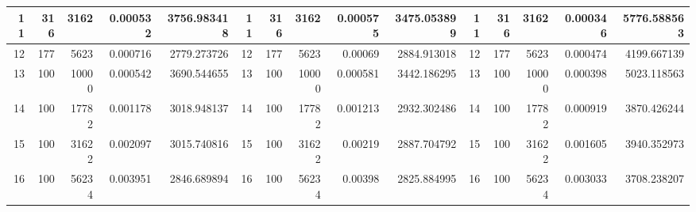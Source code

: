 \begin{table}[htbp]
\begin{tabular}{|r|r|r|r|r|r|r|r|r|r|r|r|r|r|r|}
		\midrule
		11                                & 316                             & 3162                            & 0.000532                           & 3756.983418                          & 11                               & 316                             & 3162                            & 0.000575                           & 3475.053899                          & 11 & 316   & 3162    & 0.000346 & 5776.588563 \\
		\midrule
		12                                & 177                             & 5623                            & 0.000716                           & 2779.273726                          & 12                               & 177                             & 5623                            & 0.00069                            & 2884.913018                          & 12 & 177   & 5623    & 0.000474 & 4199.667139 \\
		\midrule
		13                                & 100                             & 10000                           & 0.000542                           & 3690.544655                          & 13                               & 100                             & 10000                           & 0.000581                           & 3442.186295                          & 13 & 100   & 10000   & 0.000398 & 5023.118563 \\
		\midrule
		14                                & 100                             & 17782                           & 0.001178                           & 3018.948137                          & 14                               & 100                             & 17782                           & 0.001213                           & 2932.302486                          & 14 & 100   & 17782   & 0.000919 & 3870.426244 \\
		\midrule
		15                                & 100                             & 31622                           & 0.002097                           & 3015.740816                          & 15                               & 100                             & 31622                           & 0.00219                            & 2887.704792                          & 15 & 100   & 31622   & 0.001605 & 3940.352973 \\
		\midrule
		16                                & 100                             & 56234                           & 0.003951                           & 2846.689894                          & 16                               & 100                             & 56234                           & 0.00398                            & 2825.884995                          & 16 & 100   & 56234   & 0.003033 & 3708.238207 \\

\end{tabular}
\end{table}

